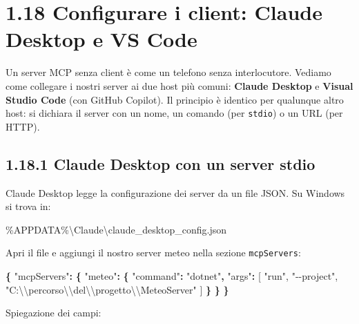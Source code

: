 \documentclass[
  italian,
  10pt,
]{book}
\newenvironment{Shaded}{\begin{snugshade}}{\end{snugshade}}
\newcommand{\CharTok}[1]{\textcolor[rgb]{0.31,0.60,0.02}{#1}}
\newcommand{\DataTypeTok}[1]{\textcolor[rgb]{0.13,0.29,0.53}{#1}}
\newcommand{\FunctionTok}[1]{\textcolor[rgb]{0.13,0.29,0.53}{\textbf{#1}}}
\newcommand{\NormalTok}[1]{#1}
\newcommand{\OtherTok}[1]{\textcolor[rgb]{0.56,0.35,0.01}{#1}}
\newcommand{\StringTok}[1]{\textcolor[rgb]{0.31,0.60,0.02}{#1}}
\begin{document}
\section{1.18 Configurare i client: Claude Desktop e VS
Code}\label{configurare-i-client-claude-desktop-e-vs-code}

Un server MCP senza client è come un telefono senza interlocutore.
Vediamo come collegare i nostri server ai due host più comuni:
\textbf{Claude Desktop} e \textbf{Visual Studio Code} (con GitHub
Copilot). Il principio è identico per qualunque altro host: si dichiara
il server con un nome, un comando (per \texttt{stdio}) o un URL (per
HTTP).

\subsection{1.18.1 Claude Desktop con un server
stdio}\label{claude-desktop-con-un-server-stdio}

Claude Desktop legge la configurazione dei server da un file JSON. Su
Windows si trova in:

\begin{Shaded}
\begin{Highlighting}[]
\NormalTok{\%APPDATA\%\textbackslash{}Claude\textbackslash{}claude\_desktop\_config.json}
\end{Highlighting}
\end{Shaded}

Apri il file e aggiungi il nostro server meteo nella sezione
\texttt{mcpServers}:

\begin{Shaded}
\begin{Highlighting}[]
\FunctionTok{\{}
  \DataTypeTok{"mcpServers"}\FunctionTok{:} \FunctionTok{\{}
    \DataTypeTok{"meteo"}\FunctionTok{:} \FunctionTok{\{}
      \DataTypeTok{"command"}\FunctionTok{:} \StringTok{"dotnet"}\FunctionTok{,}
      \DataTypeTok{"args"}\FunctionTok{:} \OtherTok{[}
        \StringTok{"run"}\OtherTok{,}
        \StringTok{"{-}{-}project"}\OtherTok{,}
        \StringTok{"C:}\CharTok{\textbackslash{}\textbackslash{}}\StringTok{percorso}\CharTok{\textbackslash{}\textbackslash{}}\StringTok{del}\CharTok{\textbackslash{}\textbackslash{}}\StringTok{progetto}\CharTok{\textbackslash{}\textbackslash{}}\StringTok{MeteoServer"}
      \OtherTok{]}
    \FunctionTok{\}}
  \FunctionTok{\}}
\FunctionTok{\}}
\end{Highlighting}
\end{Shaded}

Spiegazione dei campi:
\end{document}
